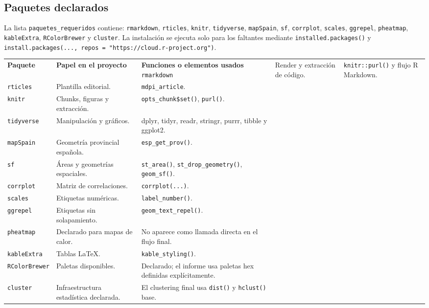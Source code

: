 \documentclass[10pt,a4paper]{article}
\newcommand{\code}[1]{\texttt{\small #1}}
\begin{document}
\subsection{Paquetes declarados}
La lista \code{paquetes\_requeridos} contiene: \code{rmarkdown}, \code{rticles}, \code{knitr}, \code{tidyverse}, \code{mapSpain}, \code{sf}, \code{corrplot}, \code{scales}, \code{ggrepel}, \code{pheatmap}, \code{kableExtra}, \code{RColorBrewer} y \code{cluster}. La instalación se ejecuta solo para los faltantes mediante \code{installed.packages()} y \code{install.packages(..., repos = "https://cloud.r-project.org")}.

\begin{longtable}{p{}p{}p{}}
\toprule\textbf{Paquete} & \textbf{Papel en el proyecto} & \textbf{Funciones o elementos usados}\
\midrule\endhead
\code{rmarkdown} & Render y extracción de código. & \code{knitr::purl()} y flujo R Markdown.\\
\code{rticles} & Plantilla editorial. & \code{mdpi\_article}.\\
\code{knitr} & Chunks, figuras y extracción. & \code{opts\_chunk\$set()}, \code{purl()}.\\
\code{tidyverse} & Manipulación y gráficos. & dplyr, tidyr, readr, stringr, purrr, tibble y ggplot2.\\
\code{mapSpain} & Geometría provincial española. & \code{esp\_get\_prov()}.\\
\code{sf} & Áreas y geometrías espaciales. & \code{st\_area()}, \code{st\_drop\_geometry()}, \code{geom\_sf()}.\\
\code{corrplot} & Matriz de correlaciones. & \code{corrplot(...)}.\\
\code{scales} & Etiquetas numéricas. & \code{label\_number()}.\\
\code{ggrepel} & Etiquetas sin solapamiento. & \code{geom\_text\_repel()}.\\
\code{pheatmap} & Declarado para mapas de calor. & No aparece como llamada directa en el flujo final.\\
\code{kableExtra} & Tablas LaTeX. & \code{kable\_styling()}.\\
\code{RColorBrewer} & Paletas disponibles. & Declarado; el informe usa paletas hex definidas explícitamente.\\
\code{cluster} & Infraestructura estadística declarada. & El clustering final usa \code{dist()} y \code{hclust()} base.\\
\bottomrule
\end{longtable}
\end{document}
